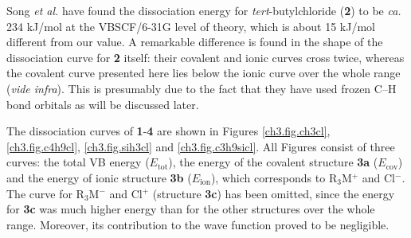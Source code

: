 Song \textit{et al.} \cite{song} have found the dissociation energy for \textit{tert}-butylchloride (\textbf{2}) to be \textit{ca.} 234 kJ/mol at the VBSCF/6-31G level of theory, which is about 15 kJ/mol different from our value.  A remarkable difference is found in the shape of the dissociation curve for \textbf{2} itself: their covalent and ionic curves cross twice, whereas the covalent curve presented here lies below the ionic curve over the whole range (\textit{vide infra}). This is presumably due to the fact that they have used frozen C--H bond orbitals as will be discussed later.

The dissociation curves of \textbf{1}-\textbf{4} are shown in Figures \ref{ch3.fig.ch3cl}, \ref{ch3.fig.c4h9cl}, \ref{ch3.fig.sih3cl} and \ref{ch3.fig.c3h9sicl}. All Figures consist of three curves: the total VB energy ($E_\mathrm{tot}$), the energy of the covalent structure \textbf{3a} ($E_\mathrm{cov}$) and the energy of ionic structure \textbf{3b} ($E_\mathrm{ion}$), which corresponds to R$_3$M$^{+}$ and Cl$^{-}$. The curve for R$_3$M$^{-}$ and Cl$^{+}$ (structure \textbf{3c}) has been omitted, since the energy for \textbf{3c} was much higher energy than for the other structures over the whole range. Moreover, its contribution to the wave function proved to be negligible.  

